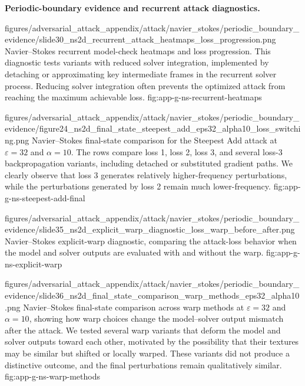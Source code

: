 \FloatBarrier
{}

\noindent\textbf{Periodic-boundary evidence and recurrent attack diagnostics.}

\appendixattackfigstacked
  {figures/adversarial_attack_appendix/attack/navier_stokes/periodic_boundary_evidence/slide30_ns2d_recurrent_attack_heatmaps_loss_progression.png}
  {Navier--Stokes recurrent model-check heatmaps and loss progression. This
  diagnostic tests variants with reduced solver integration, implemented by
  detaching or approximating key intermediate frames in the recurrent solver
  process. Reducing solver integration often prevents the optimized attack from
  reaching the maximum achievable loss.}
  {fig:app-g-ns-recurrent-heatmaps}

\appendixattackfigfullportrait
  {figures/adversarial_attack_appendix/attack/navier_stokes/periodic_boundary_evidence/figure24_ns2d_final_state_steepest_add_eps32_alpha10_loss_switching.png}
  {Navier--Stokes final-state comparison for the Steepest Add attack at
  $\varepsilon=32$ and $\alpha=10$. The rows compare loss 1, loss 2, loss 3, and
  several loss-3 backpropagation variants, including detached or substituted
  gradient paths. We clearly observe that loss 3 generates relatively
  higher-frequency perturbations, while the perturbations generated by loss 2
  remain much lower-frequency.}
  {fig:app-g-ns-steepest-add-final}

\appendixattackfigportraitwidelarge
  {figures/adversarial_attack_appendix/attack/navier_stokes/periodic_boundary_evidence/slide35_ns2d_explicit_warp_diagnostic_loss_warp_before_after.png}
  {Navier--Stokes explicit-warp diagnostic, comparing the attack-loss behavior when
  the model and solver outputs are evaluated with and without the warp.}
  {fig:app-g-ns-explicit-warp}

\appendixattackfigportraitwidelarge
  {figures/adversarial_attack_appendix/attack/navier_stokes/periodic_boundary_evidence/slide36_ns2d_final_state_comparison_warp_methods_eps32_alpha10.png}
  {Navier--Stokes final-state comparison across warp methods at $\varepsilon=32$
  and $\alpha=10$, showing how warp choices change the model--solver output
  mismatch after the attack. We tested several warp variants that deform the
  model and solver outputs toward each other, motivated by the possibility that
  their textures may be similar but shifted or locally warped. These variants
  did not produce a distinctive outcome, and the final perturbations remain
  qualitatively similar.}
  {fig:app-g-ns-warp-methods}

